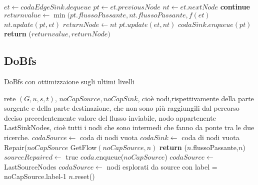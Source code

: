 \documentclass{article}
\begin{document}
\begin{algorithm}
    \begin{algorithmic}
        \STATE $et \leftarrow codaEdgeSink.dequeue$
        \STATE $pt \leftarrow et.previousNode$
        \STATE $nt \leftarrow et.nextNode$
        \STATE \textbf{continue}
        \STATE $returnvalue \leftarrow  \min(pt.flussoPassante,nt.flussoPassante,f(et)$
        \STATE $nt.update(pt,et)$
        \STATE $returnNode \leftarrow nt$
        \ENDIF
        \ELSE
        \STATE $pt.update(et,nt)$
        \STATE $codaSink.enqueue(pt)$
        \ENDIF
        \ENDIF
        \ENDWHILE
        \ENDWHILE
        \STATE \textbf{return} ($returnvalue, returnNode)$
    \end{algorithmic}
\end{algorithm}

\subsection{DoBfs}
\begin{algorithm}
    \caption{DoBfs con ottimizzaione sugli ultimi livelli}
    \begin{algorithmic}[1]
        \REQUIRE rete $(G,u,s,t)$, $noCapSource, noCapSink$, cioè nodi,rispettivamente della parte sorgente e della parte destinazione, che non sono più raggiungili dal percorso deciso precedentemente
        \ENSURE valore del flusso inviabile, nodo appartenente LastSinkNodes, cioè tutti i nodi che sono intermedi che fanno da ponte tra le due ricerche.
        \STATE $codaSource \leftarrow$ coda di nodi vuota
        \STATE $codaSink \leftarrow$ coda di nodi vuota
        \STATE Repair($noCapSource$
        \STATE GetFlow$(noCapSource,n)$ 
        \STATE \textbf{return} ($n$.flussoPassante,$n$)
        \ENDIF
        \ENDFOR
        \ELSE
        \STATE $sourceRepaired \leftarrow$ true
        \ENDIF
        \ENDIF
        \STATE $coda.$enqueue($noCapSource$)
        \STATE $codaSource \leftarrow$ LastSourceNodes 
        \ELSE
        \STATE $codaSource \leftarrow$ nodi esplorati da source con label = noCapSource.label-1
        \STATE $n.$reset()
        \ENDFOR
        \ENDIF
        \ENDIF

    \end{algorithmic}
\end{algorithm}
\end{document}
